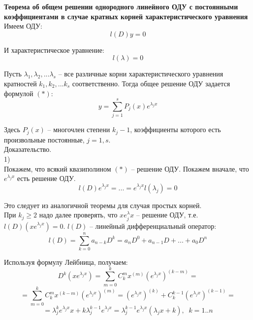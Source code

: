 \documentclass{article}
\begin{document}
	
	\textbf{Теорема об общем решении однородного линейного ОДУ с постоянными коэффициентами в случае кратных корней характеристического уравнения}\\

	Имеем ОДУ:
	\begin{equation}
		l(D)y = 0
	\end{equation}

	И характеристическое уравнение:
	\begin{equation}
		l(\lambda) = 0
	\end{equation}

	Пусть $\lambda_1,\lambda_2,...\lambda_s$ -- все различные корни характеристического уравнения кратностей $k_1,k_2,...k_s$ соответственно. Тогда общее решение ОДУ задается формулой $(*)$:
	\begin{equation}
		y = \sum_{j=1}^s P_j(x) e^{\lambda_j x}
	\end{equation}

	Здесь $P_j(x)$ -- многочлен степени $k_j - 1$, коэффициенты которого есть произвольные постоянные, $j = 1, s$.\\

	Доказательство.\\

	1)\\

	Покажем, что всякий квазиполином $(*)$ -- решение ОДУ. Покажем вначале, что $e^{\lambda_jx}$ есть решение ОДУ.
	\begin{equation}
		l(D)e^{\lambda_jx}=...=e^{\lambda_jx}l(\lambda_j)=0
	\end{equation}

	Это следует из аналогичной теоремы для случая простых корней.\\

	При $k_j\geq 2$ надо далее проверять, что $xe^{\lambda}_j x$ -- решение ОДУ, т.е. $l(D)(xe^{\lambda_jx})=0$. $l(D)$ -- линейный дифференциальный оператор:
	\begin{equation}
		l(D)=\sum_{k=0}^n a_{n-k} D^k = a_nD^0 + a_{n-1}D + ... + a_0D^n
	\end{equation}

	Используя формулу Лейбница, получаем:
	\begin{equation}
		D^k(xe^{\lambda_jx}) = \sum_{m=0}^k C_k^m x^{(m)}(e^{\lambda_j x})^{(k-m)} = 
	\end{equation}
	\begin{equation}
		= \sum_{m=0}^{k} C_k^mx^{(k-m)}(e^{\lambda_jx})^{(m)}=(e^{\lambda_jx})^{(k)}+C_k^{k-1}(e^{\lambda_jx})^{(k-1)} = 
	\end{equation}
	\begin{equation}
		= \lambda_j^ke^{\lambda_jx}x+k\lambda_j^{k-1}e^{\lambda_jx}=\lambda_j^{k-1}e^{\lambda_jx}(\lambda_jx+k),\;\;k=1..n
	\end{equation}
\end{document}
